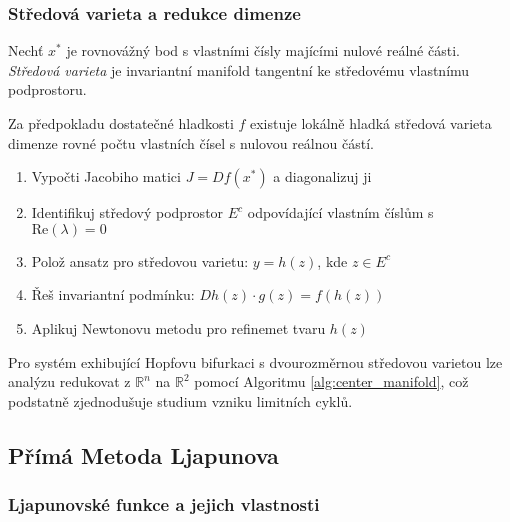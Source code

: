 \subsubsection{Středová varieta a redukce dimenze}

\begin{definition}
Nechť $x^*$ je rovnovážný bod s vlastními čísly majícími nulové reálné části. \emph{Středová varieta} je invariantní manifold tangentní ke středovému vlastnímu podprostoru.
\end{definition}

\begin{theorem}
Za předpokladu dostatečné hladkosti $f$ existuje lokálně hladká středová varieta dimenze rovné počtu vlastních čísel s nulovou reálnou částí.
\end{theorem}

\begin{algorithm}
\label{alg:center_manifold}
\begin{enumerate}
\item Vypočti Jacobiho matici $J = Df(x^*)$ a diagonalizuj ji
\item Identifikuj středový podprostor $E^c$ odpovídající vlastním číslům s $\mathrm{Re}(\lambda) = 0$
\item Polož ansatz pro středovou varietu: $y = h(z)$, kde $z \in E^c$
\item Řeš invariantní podmínku: $Dh(z) \cdot g(z) = f(h(z))$
\item Aplikuj Newtonovu metodu pro refinemet tvaru $h(z)$
\end{enumerate}
\end{algorithm}

\begin{application}
Pro systém exhibující Hopfovu bifurkaci s dvourozměrnou středovou varietou lze analýzu redukovat z $\mathbb{R}^n$ na $\mathbb{R}^2$ pomocí Algoritmu \ref{alg:center_manifold}, což podstatně zjednodušuje studium vzniku limitních cyklů.
\end{application}

\spc

\subsection{Přímá Metoda Ljapunova}

\subsubsection{Ljapunovské funkce a jejich vlastnosti}


